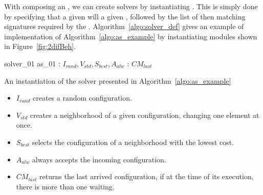 

With \bothmodules{} composing an \as, we can create solvers by instantiating \ms. This is simply done by specifying that a given \mbox{} will \mbox{} a given \as, followed by the list of \omprefix{} then \opchs{} matching signatures required by the \as. Algorithm~\ref{algo:solver_def} gives an example of implementation of Algorithm~\ref{algo:as_example} by instantiating modules shown in Figure~\ref{fig:2difBeh}.

\begin{algorithm}[H]
\dontprintsemicolon
\SetNoline
{}
 solver\_01  as\_01\;
 : $I_{rand}, V_{std}, S_{best}, A_{alw}$ \; 
: $CM_{last}$\; %
\caption{An instantiation of the solver presented in Algorithm~\ref{algo:as_example}}\label{algo:solver_def}
\end{algorithm}

\begin{itemize}
\item $I_{rand}$ creates a random configuration.
\item $V_{std}$ creates a neighborhood of a given configuration, changing one element at once.
\item $S_{best}$ selects the configuration of a neighborhood with the lowest cost.
\item $A_{alw}$ always accepts the incoming configuration.
\item $CM_{last}$ returns the last arrived configuration, if at the time of its execution, there is more than one waiting. 
\end{itemize}